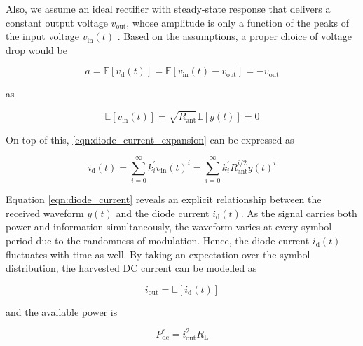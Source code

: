 Also, we assume an ideal rectifier with steady-state response that delivers a constant output voltage ${v_{{\text{out}}}}$, whose amplitude is only a function of the peaks of the input voltage ${v_{{\text{in}}}}(t)$ \cite{Curty2005}. Based on the assumptions, a proper choice of voltage drop would be

\begin{equation}\label{eqn:diode_voltage_drop}
  a = \mathbb{E}\left[ {{v_{\text{d}}}(t)} \right] = \mathbb{E}\left[ {{v_{{\text{in}}}}(t) - {v_{{\text{out}}}}} \right] =  - {v_{{\text{out}}}}
\end{equation}

as

\begin{equation}\label{eqn:output_voltage_expectation}
  \mathbb{E}\left[ {{v_{{\text{in}}}}(t)} \right] = \sqrt {{R_{{\text{ant}}}}} \mathbb{E}\left[ {y(t)} \right] = 0
\end{equation}

On top of this, \ref{eqn:diode_current_expansion} can be expressed as

\begin{equation}\label{eqn:diode_current}
  {i_{\text{d}}}(t) = \sum\limits_{i = 0}^\infty  {k_i^\prime } {v_{{\text{in}}}}{(t)^i} = \sum\limits_{i = 0}^\infty  {k_i^\prime } R_{{\text{ant}}}^{i/2}y{(t)^i}
\end{equation}

Equation \ref{eqn:diode_current} reveals an explicit relationship between the received waveform $y(t)$ and the diode current ${i_{\text{d}}}(t)$. As the signal carries both power and information simultaneously, the waveform varies at every symbol period due to the randomness of modulation. Hence, the diode current ${i_{\text{d}}}(t)$ fluctuates with time as well. By taking an expectation over the symbol distribution, the harvested DC current can be modelled as

\begin{equation}\label{eqn:diode_current_expectation}
  {i_{{\text{out}}}} = \mathbb{E}\left[ {{i_{\text{d}}}(t)} \right]
\end{equation}

and the available power is

\begin{equation}\label{eqn:harvested_power}
  P_{{\text{dc}}}^r = i_{{\text{out}}}^2{R_{\text{L}}}
\end{equation}


